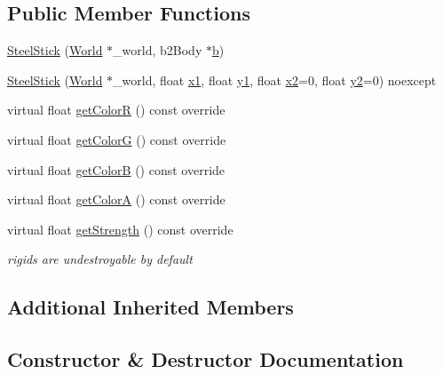 \subsection*{Public Member Functions}
\begin{DoxyCompactItemize}
\item 
\hyperlink{classSteelStick_a0839171231876f5ae62810dcb4f0f797}{Steel\+Stick} (\hyperlink{classWorld}{World} $\ast$\+\_\+world, b2\+Body $\ast$\hyperlink{image_8h_ab2d05693952610f937e5acb3c4a8fa1b}{b})
\item 
\hyperlink{classSteelStick_a157cab49946d6e4a51cf45efbf4e63e7}{Steel\+Stick} (\hyperlink{classWorld}{World} $\ast$\+\_\+world, float \hyperlink{classStick_a64598c448a15601cca5da6f1746db6bd}{x1}, float \hyperlink{classStick_aa90dd67e8ce5ea1ea2106ad46c05b012}{y1}, float \hyperlink{classStick_aa0c2a77310a9cbb517cfe62545bb77f4}{x2}=0, float \hyperlink{classStick_a1cae5d5fbddeb3ef7a653376da1dd2c6}{y2}=0) noexcept
\item 
virtual float \hyperlink{classSteelStick_aaa82c2460e492c249074058a83245634}{get\+Color\+R} () const override
\item 
virtual float \hyperlink{classSteelStick_a3af94ded9f36368b79a5913de3ecef3a}{get\+Color\+G} () const override
\item 
virtual float \hyperlink{classSteelStick_aa766a601b7b048d7afbe593d7a1b544d}{get\+Color\+B} () const override
\item 
virtual float \hyperlink{classSteelStick_ac4d726f343aa8cd6c2d3306855ba48c2}{get\+Color\+A} () const override
\item 
virtual float \hyperlink{classSteelStick_a2766638fc85df28288e6d6dfb7222fea}{get\+Strength} () const override
\begin{DoxyCompactList}\small\item\em rigids are undestroyable by default \end{DoxyCompactList}\end{DoxyCompactItemize}
\subsection*{Additional Inherited Members}


\subsection{Constructor \& Destructor Documentation}
\hypertarget{classSteelStick_a0839171231876f5ae62810dcb4f0f797}{}
